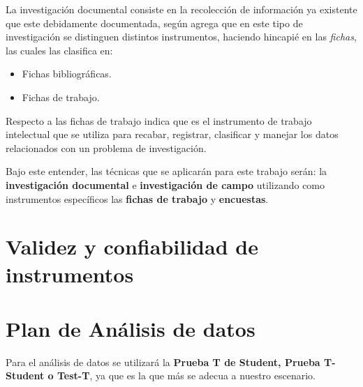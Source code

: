 La investigación documental consiste en la recolección de información ya existente
que este debidamente documentada, según \cite{robledo} agrega que en este tipo
de investigación se distinguen distintos instrumentos, haciendo hincapié en las
\emph{fichas}, las cuales \citep{robledo} las clasifica en:
\begin{itemize}
    \item Fichas bibliográficas.
    \item Fichas de trabajo.
\end{itemize}

Respecto a las fichas de trabajo \cite{robledo} indica que es el instrumento de
trabajo intelectual que se utiliza para recabar, registrar, clasificar y
manejar los datos relacionados con un problema de investigación.

Bajo este entender, las técnicas que se aplicarán para este trabajo serán:
la \textbf{investigación documental} e \textbf{investigación de campo} utilizando
como instrumentos específicos las \textbf{fichas de trabajo} y \textbf{encuestas}.

\section{Validez y confiabilidad de instrumentos}

\section{Plan de Análisis de datos}
Para el análisis de datos se utilizará la \textbf{Prueba T de Student, Prueba
T-Student o Test-T}, ya que es la que más se adecua a nuestro escenario.
